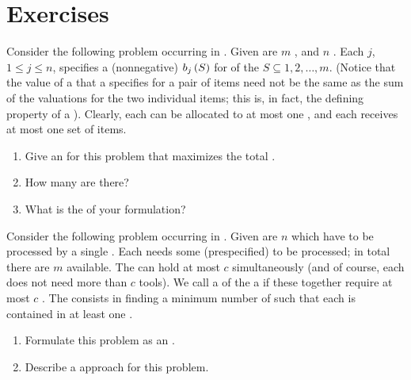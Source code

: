 \section*{Exercises}
\begin{exercise}
Consider the following problem occurring in . Given are $m$ , and $n$ . Each  $j$, $1\leq j\leq n$, specifies a (nonnegative)  $b_j\left( S \right)$ for  of the  $S\subseteq{1,2,\ldots,m}$. (Notice that the value of a  that a  specifies for a pair of items need not be the same as the sum of the valuations for the two individual items; this is, in fact, the defining property of a ). Clearly, each  can be allocated to at most one , and each  receives at most one set of items.
\begin{enumerate}
 \item Give an  for this problem that maximizes the total .
 \item How many  are there?
 \item What is the  of your formulation?
\end{enumerate}
\end{exercise}

\begin{exercise}
Consider the following problem occurring in . Given are $n$  which have to be processed by a single . Each  needs some (prespecified)  to be processed; in total there are $m$  available. The  can hold at most $c$  simultaneously (and of course, each  does not need more than $c$ tools). We call a  of the  a  if these  together require at most $c$ . The  consists in finding a minimum number of  such that each  is contained in at least one .
\begin{enumerate}
 \item Formulate this problem as an .
 \item Describe a  approach for this problem.
\end{enumerate}
\end{exercise}

